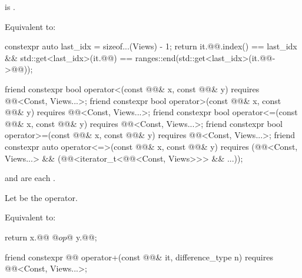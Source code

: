 \begin{itemdescr}
\pnum
\expects
{} is .

\pnum
\effects
Equivalent to:
\begin{codeblock}
constexpr auto last_idx = sizeof...(Views) - 1;
return it.@@.index() == last_idx &&
       std::get<last_idx>(it.@@) == ranges::end(std::get<last_idx>(it.@@->@@));
\end{codeblock}
\end{itemdescr}

%
\begin{itemdecl}
friend constexpr bool operator<(const @@& x, const @@& y)
  requires @@<Const, Views...>;
friend constexpr bool operator>(const @@& x, const @@& y)
  requires @@<Const, Views...>;
friend constexpr bool operator<=(const @@& x, const @@& y)
  requires @@<Const, Views...>;
friend constexpr bool operator>=(const @@& x, const @@& y)
  requires @@<Const, Views...>;
friend constexpr auto operator<=>(const @@& x, const @@& y)
  requires (@@<Const, Views...> &&
            (@@<iterator_t<@@<Const, Views>>> && ...));
\end{itemdecl}

\begin{itemdescr}
\pnum
\expects
{} and
 are each .

\pnum
Let  be the operator.

\pnum
\effects
Equivalent to:
\begin{codeblock}
return x.@@ @$op$@ y.@@;
\end{codeblock}
\end{itemdescr}

%
\begin{itemdecl}
friend constexpr @@ operator+(const @@& it, difference_type n)
  requires @@<Const, Views...>;
\end{itemdecl}

